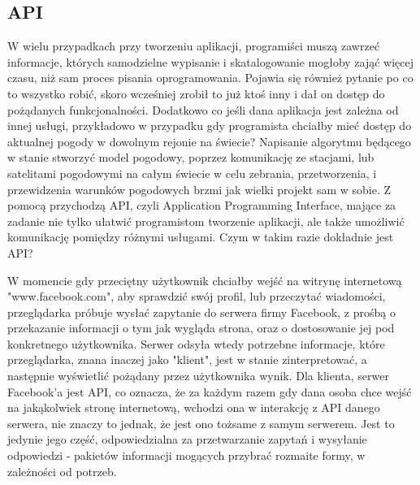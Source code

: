 \documentclass[12pt, a4paper]{article}
\begin{document}
\begin{sloppypar}
{  \subsection{API}
  {
    W wielu przypadkach przy tworzeniu aplikacji, programiści muszą zawrzeć
    informacje, których samodzielne wypisanie i skatalogowanie mogłoby zająć
    więcej czasu, niż sam proces pisania oprogramowania. Pojawia się również
    pytanie po co to wszystko robić, skoro wcześniej zrobił to już ktoś inny i
    dał on dostęp do pożądanych funkcjonalności. Dodatkowo co jeśli dana aplikacja
    jest zależna od innej usługi, przykładowo w przypadku gdy programista chciałby
    mieć dostęp do aktualnej pogody w dowolnym rejonie na świecie? Napisanie algorytmu
    będącego w stanie stworzyć model pogodowy, poprzez komunikację ze stacjami,
    lub satelitami pogodowymi na całym świecie w celu zebrania, przetworzenia, i 
    przewidzenia warunków pogodowych brzmi jak wielki projekt sam w sobie.
    Z pomocą przychodzą API, czyli Application Programming Interface, mające za 
    zadanie nie tylko ułatwić programistom tworzenie aplikacji, ale także 
    umożliwić komunikację pomiędzy różnymi usługami. Czym w takim razie dokładnie jest API?

    W momencie gdy przeciętny użytkownik chciałby wejść na witrynę internetową 
    "www.facebook.com", aby sprawdzić swój profil, lub przeczytać wiadomości, 
    przeglądarka próbuje wysłać zapytanie do serwera firmy Facebook, z prośbą o
    przekazanie informacji o tym jak wygląda strona, oraz o dostosowanie jej pod
    konkretnego użytkownika. Serwer odsyła wtedy potrzebne informacje, które przeglądarka,
    znana inaczej jako "klient", jest w stanie zinterpretować, a następnie wyświetlić 
    pożądany przez użytkownika wynik. Dla klienta, serwer Facebook'a jest API, co oznacza,
    że za każdym razem gdy dana osoba chce wejść na jakąkolwiek stronę internetową,
    wchodzi ona w interakcję z API danego serwera, nie znaczy to jednak, że jest ono
    tożsame z samym serwerem. Jest to jedynie jego część, odpowiedzialna za przetwarzanie
    zapytań i wysyłanie odpowiedzi - pakietów informacji mogących przybrać rozmaite formy,
    w zależności od potrzeb.
    
}}
\end{sloppypar}
\end{document}
